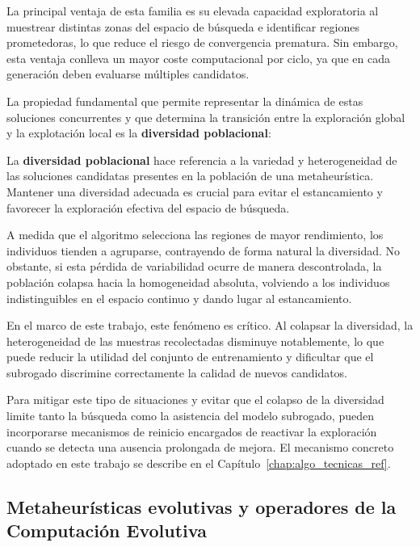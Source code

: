 La principal ventaja de esta familia es su elevada capacidad exploratoria al muestrear distintas zonas del espacio de búsqueda e identificar regiones prometedoras, lo que reduce el riesgo de convergencia prematura. Sin embargo, esta ventaja conlleva un mayor coste computacional por ciclo, ya que en cada generación deben evaluarse múltiples candidatos.

La propiedad fundamental que permite representar la dinámica de estas soluciones concurrentes y que determina la transición entre la exploración global y la explotación local es la \textbf{diversidad poblacional}:

\begin{definicion}
    La \textbf{diversidad poblacional} hace referencia a la variedad y heterogeneidad de las soluciones candidatas presentes en la población de una metaheurística. Mantener una diversidad adecuada es crucial para evitar el estancamiento y favorecer la exploración efectiva del espacio de búsqueda.
\end{definicion}

A medida que el algoritmo selecciona las regiones de mayor rendimiento, los individuos tienden a agruparse, contrayendo de forma natural la diversidad. No obstante, si esta pérdida de variabilidad ocurre de manera descontrolada, la población colapsa hacia la homogeneidad absoluta, volviendo a los individuos indistinguibles en el espacio continuo y dando lugar al estancamiento.

En el marco de este trabajo, este fenómeno es crítico. Al colapsar la
diversidad, la heterogeneidad de las muestras recolectadas disminuye
notablemente, lo que puede reducir la utilidad del conjunto de entrenamiento y
dificultar que el subrogado discrimine correctamente la calidad de nuevos
candidatos.

Para mitigar este tipo de situaciones y evitar que el colapso de la diversidad
limite tanto la búsqueda como la asistencia del modelo subrogado, pueden
incorporarse mecanismos de reinicio encargados de reactivar la exploración
cuando se detecta una ausencia prolongada de mejora. El mecanismo concreto
adoptado en este trabajo se describe en el Capítulo~\ref{chap:algo_tecnicas_ref}.

\subsection{Metaheurísticas evolutivas y operadores de la Computación Evolutiva}
\label{subsec:mh_evolutivas}


